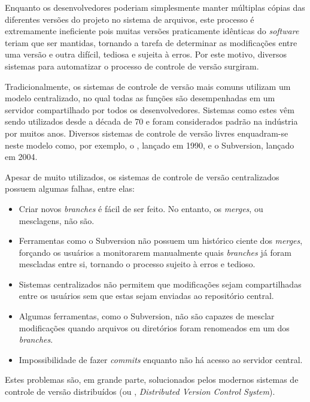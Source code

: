 Enquanto os desenvolvedores poderiam simplesmente manter múltiplas cópias das diferentes versões do projeto no sistema de arquivos, este processo é extremamente ineficiente pois muitas versões praticamente idênticas do \emph{software} teriam que ser mantidas, tornando a tarefa de determinar as modificações entre uma versão e outra difícil, tediosa e sujeita à erros.
Por este motivo, diversos sistemas para automatizar o processo de controle de versão surgiram.

Tradicionalmente, os sistemas de controle de versão mais comuns utilizam um modelo centralizado, no qual todas as funções são desempenhadas em um servidor compartilhado por todos os desenvolvedores.
Sistemas como estes vêm sendo utilizados desde a década de 70 e foram considerados padrão na indústria por muitos anos.
Diversos sistemas de controle de versão livres enquadram-se neste modelo como, por exemplo, o , lançado em 1990, e o Subversion, lançado em 2004.

Apesar de muito utilizados, os sistemas de controle de versão centralizados possuem algumas falhas, entre elas:

\begin{itemize}
	\item Criar novos \emph{branches} é fácil de ser feito. No entanto, os \emph{merges}, ou mesclagens, não são.
	\item Ferramentas como o Subversion não possuem um histórico ciente dos \emph{merges}, forçando os usuários a monitorarem manualmente quais \emph{branches} já foram mescladas entre si, tornando o processo sujeito à erros e tedioso.
	\item Sistemas centralizados não permitem que modificações sejam compartilhadas entre os usuários sem que estas sejam enviadas ao repositório central.
	\item Algumas ferramentas, como o Subversion, não são capazes de mesclar modificações quando arquivos ou diretórios foram renomeados em um dos \emph{branches}.
	\item Impossibilidade de fazer \emph{commits} enquanto não há acesso ao servidor central.
\end{itemize}

Estes problemas são, em grande parte, solucionados pelos modernos sistemas de controle de versão distribuídos (ou , \emph{Distributed Version Control System}).

